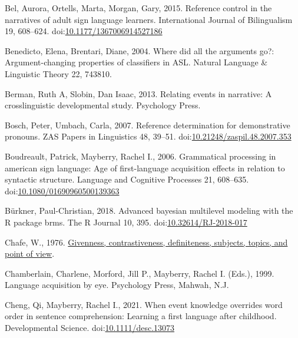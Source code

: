 \documentclass[]{elsarticle} %
\newlength{\cslhangindent}
\newenvironment{CSLReferences}[2] %
 {%
  \setlength{\parindent}{0pt}
  \ifodd #1 \everypar{\setlength{\hangindent}{\cslhangindent}}\ignorespaces\fi
  \ifnum #2 > 0
  \setlength{\parskip}{#2\baselineskip}
  \fi
 }%
 {}
\begin{document}
\begin{CSLReferences}{1}{0}
\leavevmode{}%
Bel, Aurora, Ortells, Marta, Morgan, Gary, 2015. Reference control in
the narratives of adult sign language learners. International Journal of
Bilingualism 19, 608--624.
doi:\href{https://doi.org/10.1177/1367006914527186}{10.1177/1367006914527186}

\leavevmode{}%
Benedicto, Elena, Brentari, Diane, 2004. Where did all the arguments
go?: Argument-changing properties of classifiers in ASL. Natural
Language \& Linguistic Theory 22, 743810.

\leavevmode{}%
Berman, Ruth A, Slobin, Dan Isaac, 2013. Relating events in narrative: A
crosslinguistic developmental study. Psychology Press.

\leavevmode{}%
Bosch, Peter, Umbach, Carla, 2007. Reference determination for
demonstrative pronouns. ZAS Papers in Linguistics 48, 39--51.
doi:\href{https://doi.org/10.21248/zaspil.48.2007.353}{10.21248/zaspil.48.2007.353}

\leavevmode{}%
Boudreault, Patrick, Mayberry, Rachel I., 2006. Grammatical processing
in american sign language: Age of first-language acquisition effects in
relation to syntactic structure. Language and Cognitive Processes 21,
608--635.
doi:\href{https://doi.org/10.1080/01690960500139363}{10.1080/01690960500139363}

\leavevmode{}%
Bürkner, Paul-Christian, 2018. Advanced bayesian multilevel modeling
with the R package brms. The R Journal 10, 395.
doi:\href{https://doi.org/10.32614/RJ-2018-017}{10.32614/RJ-2018-017}

\leavevmode{}%
Chafe, W., 1976.
\href{https:///paper/Givenness\%2C-contrastiveness\%2C-definiteness\%2C-subjects\%2C-Chafe/805a12a9bee00562f6c2663722e9f7f3f5991848}{Givenness,
contrastiveness, definiteness, subjects, topics, and point of view}.

\leavevmode{}%
Chamberlain, Charlene, Morford, Jill P., Mayberry, Rachel I. (Eds.),
1999. Language acquisition by eye. Psychology Press, Mahwah, N.J.

\leavevmode{}%
Cheng, Qi, Mayberry, Rachel I., 2021. When event knowledge overrides
word order in sentence comprehension: Learning a first language after
childhood. Developmental Science.
doi:\href{https://doi.org/10.1111/desc.13073}{10.1111/desc.13073}


\end{CSLReferences}
\end{document}
